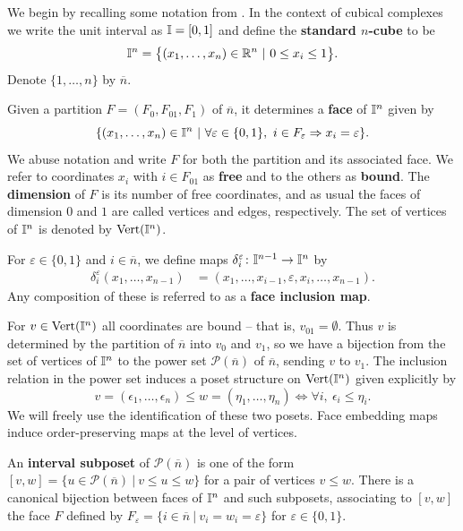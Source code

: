 We begin by recalling some notation from \cite{FMS-flows}. In the context of cubical complexes we write the unit interval as $\mathbb{I}=[0,1]$ and define the \textbf{standard $n$-cube} to be
\begin{equation*}
\mathbb{I}^n = \big\{ (x_1, \dots, x_n) \in \mathbb{R}^n\ |\ 0 \leq x_i \leq 1 \big\}.
\end{equation*}
Denote $\{1, \dots, n\}$ by $\overline{n}$.

Given a partition $F = (F_0, F_{01}, F_1)$ of $\overline n$, it determines a \textbf{face} of $\mathbb{I}^n$ given by
\begin{equation*}
\{(x_1, \dots, x_n) \in \mathbb{I}^n\ |\ \forall \varepsilon \in \{0, 1\},\ i \in F_\varepsilon \Rightarrow x_i = \varepsilon\}.
\end{equation*}
We abuse notation and write $F$ for both the partition and its associated face.  We refer to coordinates $x_i$ with $i \in F_{01}$ as \textbf{free} and to the others as \textbf{bound}.
The \textbf{dimension} of $F$ is its number of free coordinates, and as usual the faces of dimension $0$ and $1$ are called vertices and edges, respectively. The set of vertices of $\mathbb{I}^n$ is denoted by ${\rm Vert}(\mathbb{I}^n)$.

For $\varepsilon \in \{0, 1\}$ and $i \in \overline{n}$, we define maps $\delta_i^\varepsilon \colon \mathbb{I}^{n-1} \to \mathbb{I}^{n}$ by
\begin{align*}
\delta_i^\varepsilon(x_1, \dots, x_{n-1}) & = (x_1, \dots, x_{i-1}, \varepsilon, x_i, \dots, x_{n-1}).
\end{align*}
Any composition of these is referred to as a \textbf{face inclusion map}.

For $v \in {\rm Vert}(\mathbb{I}^n)$ all coordinates are bound -- that is, $v_{01} = \emptyset$. Thus
 $v$ is determined by the partition of $\overline n$ into $v_0$ and $v_1$, so
we have a bijection from the set of vertices of $\mathbb{I}^n$ to the power set $\mathcal P(\overline n)$ of $\overline n$, sending $v$ to $v_1$.
The inclusion relation in the power set induces a poset structure on ${\rm Vert}(\mathbb{I}^n)$ given explicitly by
\begin{equation*}
v = (\epsilon_1, \dots, \epsilon_n) \leq w = (\eta_1, \dots, \eta_n) \iff \forall i,\ \epsilon_i \leq \eta_i.
\end{equation*}
We will freely use the identification of these two posets.
Face embedding maps induce order-preserving maps at the level of vertices.

An \textbf{interval subposet} of $\mathcal P(\overline n)$ is one of the form $[v, w] = \{u \in \mathcal P(\overline n)\ |\ v \leq u \leq w\}$ for a pair of vertices $v \leq w$. There is a canonical bijection between faces of $\mathbb{I}^n$ and such subposets, associating to $[v, w]$ the face $F$ defined by $F_\varepsilon = \{i \in \overline{n}\ |\ v_i = w_i = \varepsilon\}$ for $\varepsilon \in \{0, 1\}$.

